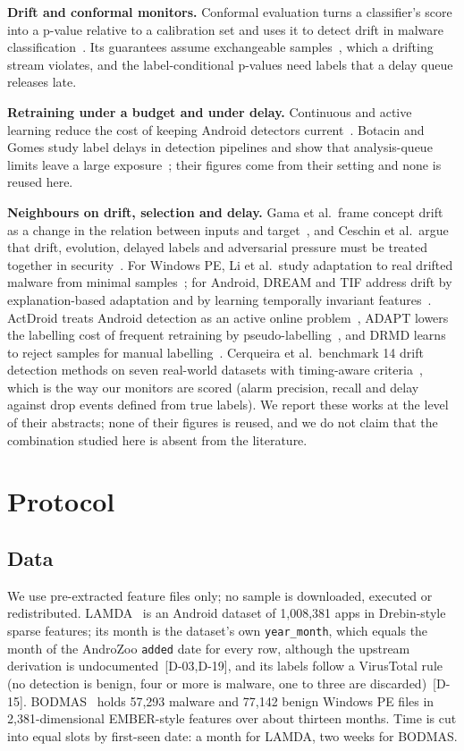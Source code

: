 \documentclass[conference,a4paper]{IEEEtran}
\newcommand{\clm}[1]{{\scriptsize[#1]}}
\begin{document}
\textbf{Drift and conformal monitors.} Conformal evaluation turns a classifier's score into a p-value relative to a calibration set and uses it to detect drift in malware classification~\cite{barbero2022transcending}. Its guarantees assume exchangeable samples~\cite{shafer2008tutorial}, which a drifting stream violates, and the label-conditional p-values need labels that a delay queue releases late.

\textbf{Retraining under a budget and under delay.} Continuous and active learning reduce the cost of keeping Android detectors current~\cite{chen2023continuous,minnei2026labelefficient,amalapuram2026seed}. Botacin and Gomes study label delays in detection pipelines and show that analysis-queue limits leave a large exposure~\cite{botacin2025labeldelays}; their figures come from their setting and none is reused here.

\textbf{Neighbours on drift, selection and delay.} Gama et al.\ frame concept drift as a change in the relation between inputs and target~\cite{gama2014survey}, and Ceschin et al.\ argue that drift, evolution, delayed labels and adversarial pressure must be treated together in security~\cite{ceschin2023stream}. For Windows PE, Li et al.\ study adaptation to real drifted malware from minimal samples~\cite{li2024revisiting}; for Android, DREAM and TIF address drift by explanation-based adaptation and by learning temporally invariant features~\cite{he2024dream,zheng2025tif}. ActDroid treats Android detection as an active online problem~\cite{muzaffar2024actdroid}, ADAPT lowers the labelling cost of frequent retraining by pseudo-labelling~\cite{alam2025adapt}, and DRMD learns to reject samples for manual labelling~\cite{mcfadden2026drmd}. Cerqueira et al.\ benchmark 14 drift detection methods on seven real-world datasets with timing-aware criteria~\cite{cerqueira2026driftbench}, which is the way our monitors are scored (alarm precision, recall and delay against drop events defined from true labels). We report these works at the level of their abstracts; none of their figures is reused, and we do not claim that the combination studied here is absent from the literature.

\section{Protocol}
\subsection{Data}
We use pre-extracted feature files only; no sample is downloaded, executed or redistributed. LAMDA~\cite{haque2025lamda} is an Android dataset of 1,008,381 apps in Drebin-style sparse features; its month is the dataset's own \texttt{year\_month}, which equals the month of the AndroZoo \texttt{added} date for every row, although the upstream derivation is undocumented~\clm{D-03,D-19}, and its labels follow a VirusTotal rule (no detection is benign, four or more is malware, one to three are discarded)~\clm{D-15}. BODMAS~\cite{yang2021bodmas} holds 57,293 malware and 77,142 benign Windows PE files in 2,381-dimensional EMBER-style features over about thirteen months. Time is cut into equal slots by first-seen date: a month for LAMDA, two weeks for BODMAS.
\end{document}
